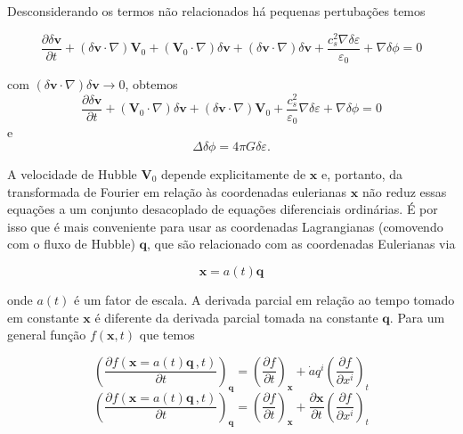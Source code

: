 \documentclass[a4paper,12pt]{article}
\begin{document}
Desconsiderando os termos não relacionados há pequenas pertubações temos

$$\dfrac{\partial \delta\mathbf{v} }{\partial t}+ (\delta\mathbf{v}\cdot \nabla)\mathbf{V}_0+ (\mathbf{V}_0\cdot \nabla) \delta\mathbf{v} + (\delta\mathbf{v}\cdot \nabla) \delta\mathbf{v} + \frac{c_s^2\nabla\delta\varepsilon}{\varepsilon_0}+ \nabla\delta\phi =0$$

com $(\delta\mathbf{v}\cdot \nabla) \delta\mathbf{v} \to 0$, obtemos
\begin{equation}\label{eq37}
	\dfrac{\partial\delta\mathbf{v}}{\partial t} + (\mathbf{V}_0 \cdot \nabla)\delta\mathbf{v} + (\delta\mathbf{v} \cdot \nabla) \mathbf{V}_0 + \dfrac{c^2_s}{\varepsilon_0}\nabla\delta\varepsilon + \nabla\delta\phi = 0
\end{equation}
\newline
e
\begin{equation}\label{eq38}
	\Delta\delta\phi = 4\pi G\delta\varepsilon.
\end{equation}

A velocidade de Hubble $\mathbf{V}_0$ depende explicitamente de $\mathbf{x}$ e, portanto, da transformada de Fourier em relação às coordenadas eulerianas $\mathbf{x}$ não reduz essas equações a um conjunto desacoplado de equações diferenciais ordinárias. É por isso que é mais conveniente para usar as coordenadas Lagrangianas (comovendo com o fluxo de Hubble) $\mathbf{q}$, que são relacionado com as coordenadas Eulerianas via

\begin{equation}\label{eq39}
	\mathbf{x} = a(t)\mathbf{q}
\end{equation}

onde $a(t)$ é um fator de escala. A derivada parcial em relação ao tempo tomado em
constante $\mathbf{x}$ é diferente da derivada parcial tomada na constante $\mathbf{q}$. Para um general função $f (\mathbf{x}, t)$ que temos

\begin{equation}\label{eq40}
	\left( \dfrac{\partial f(\mathbf{x} = a(t)\mathbf{q}\, , t)}{\partial t} \right)_\mathbf{q} = \left( \dfrac{\partial f}{\partial t} \right)_\mathbf{x} + \dot{a}q^i\left( \dfrac{\partial f}{\partial x^i} \right)_t
\end{equation}
$$\left( \dfrac{\partial f(\mathbf{x} = a(t)\mathbf{q}\, , t)}{\partial t} \right)_\mathbf{q} = \left( \dfrac{\partial f}{\partial t} \right)_\mathbf{x} + \dfrac{\partial\mathbf{x}}{\partial t}\left( \dfrac{\partial f}{\partial x^i} \right)_t$$
\end{document}
